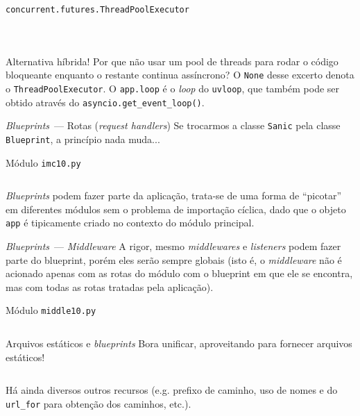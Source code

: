 \documentclass[utf8]{beamer}
\begin{document}
\begin{frame}[fragile]{\texttt{concurrent.futures.ThreadPoolExecutor}}
  \begin{columns}
    \inputminted{python}{09_executor.py}
    \inputminted{raw}{09_executor_result.txt}
  \end{columns}
  \vfill
  \fontsize{.8em}{1em}\selectfont
  Alternativa híbrida!
  Por que não usar um pool de threads para rodar o código bloqueante
  enquanto o restante continua assíncrono?
  \vfill
  O \texttt{None} desse excerto
  denota o \texttt{ThreadPoolExecutor}.
  \vfill
  O \texttt{app.loop} é o \emph{loop} do \texttt{uvloop},
  que também pode ser obtido através do
  \texttt{asyncio.get_event_loop()}.
\end{frame}


\begin{frame}[fragile]{\emph{Blueprints}~---
                       Rotas (\emph{request handlers})}
  \fontsize{.8em}{1em}\selectfont
  Se trocarmos a classe \texttt{Sanic}
  pela classe \texttt{Blueprint},
  a princípio nada muda...
  \vfill
  \begin{center}Módulo \texttt{imc10.py}\end{center}
  \inputminted{python}{imc10.py}
  \vfill
  \emph{Blueprints} podem fazer parte da aplicação,
  trata-se de uma forma de ``picotar'' em diferentes módulos
  sem o problema de importação cíclica,
  dado que o objeto \texttt{app}
  é tipicamente criado no contexto do módulo principal.
\end{frame}

\begin{frame}[fragile]{\emph{Blueprints}~--- \emph{Middleware}}
  \fontsize{.8em}{1em}\selectfont
  A rigor, mesmo \emph{middlewares} e \emph{listeners}
  podem fazer parte do blueprint, porém eles serão sempre globais
  (isto é, o \emph{middleware} não é acionado apenas com as rotas
   do módulo com o blueprint em que ele se encontra, mas com todas
   as rotas tratadas pela aplicação).
  \vfill
  \begin{center}Módulo \texttt{middle10.py}\end{center}
  \inputminted{python}{middle10.py}
\end{frame}

\begin{frame}[fragile]{Arquivos estáticos e \emph{blueprints}}
  Bora unificar, aproveitando para fornecer arquivos estáticos!
  \vfill
  \inputminted{python}{10_bp.py}
  \vfill
  Há ainda diversos outros recursos
    (e.g. prefixo de caminho,
          uso de nomes e do \texttt{url_for}
            para obtenção dos caminhos,
          etc.).
\end{frame}
\end{document}
